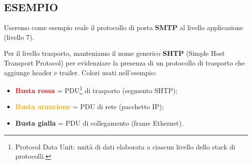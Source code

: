 \documentclass[a4paper,12pt]{report}
\begin{document}
\subsection*{ESEMPIO}
Useremo come esempio reale il protocollo di posta \textbf{SMTP} al livello applicazione (livello 7).

Per il livello trasporto, manteniamo il nome generico \textbf{SHTP} (Simple Host Transport Protocol) per evidenziare la presenza di un protocollo di trasporto che aggiunge header e trailer.
Colori usati nell’esempio:
\begin{itemize}
\item \textcolor{red}{\textbf{Busta rossa}} = PDU\footnote{Protocol Data Unit: unità di dati elaborata a ciascun livello dello stack di protocolli.}
 di trasporto (segmento SHTP);
\item \textcolor{orange}{\textbf{Busta arancione}} = PDU di rete (pacchetto IP);
\item \textcolor{yellow!80!black}{\textbf{Busta gialla}} = PDU di collegamento (frame Ethernet).
\end{itemize}
\end{document}
